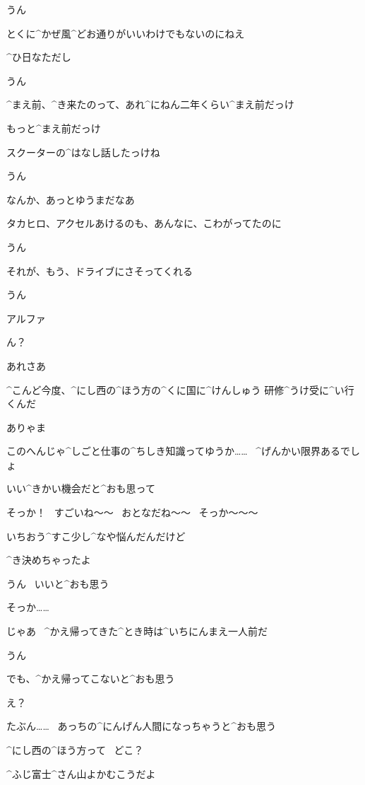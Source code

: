 \Takahiro うん

\Alpha とくに^{かぜ}{風}^{どお}{通}りがいいわけでもないのにねえ

\Alpha ^{ひ}{日}なただし

\Takahiro うん

\page
\Alpha ^{まえ}{前}、^{き}{来}たのって、あれ^{にねん}{二年}くらい^{まえ}{前}だっけ

\Alpha もっと^{まえ}{前}だっけ

\Alpha スクーターの^{はなし}{話}したっけね

\Takahiro うん

\page
\Alpha なんか、あっとゆうまだなあ

\Alpha タカヒロ、アクセルあけるのも、あんなに、こわがってたのに

\Takahiro うん

\Alpha それが、もう、ドライブにさそってくれる

\Takahiro うん

\page
\Takahiro アルファ

\Alpha ん？

\Takahiro あれさあ

\Takahiro ^{こんど}{今度}、^{にし}{西}の^{ほう}{方}の^{くに}{国}に^{けんしゅう }{研修}^{うけ}{受}に^{い}{行}くんだ

\Alpha ありゃま

\Takahiro このへんじゃ^{しごと}{仕事}の^{ちしき}{知識}ってゆうか……
\ ^{げんかい}{限界}あるでしょ

\Takahiro いい^{きかい}{機会}だと^{おも}{思}って

\Alpha そっか！
\ すごいね〜〜
\ おとなだね〜〜
\ そっか〜〜〜

\page
\Takahiro いちおう^{すこ}{少}し^{なや}{悩}んだんだけど

\Takahiro ^{き}{決}めちゃったよ

\Alpha うん
\ いいと^{おも}{思}う

\Alpha そっか……

\Alpha じゃあ
\ ^{かえ}{帰}ってきた^{とき}{時}は^{いちにんまえ}{一人前}だ

\Takahiro うん

\page
\Takahiro でも、^{かえ}{帰}ってこないと^{おも}{思}う

\Alpha え？

\Takahiro たぶん……
\ あっちの^{にんげん}{人間}になっちゃうと^{おも}{思}う

\page
\Alpha ^{にし}{西}の^{ほう}{方}って
\ どこ？

\Takahiro ^{ふじ}{富士}^{さん}{山}よかむこうだよ

